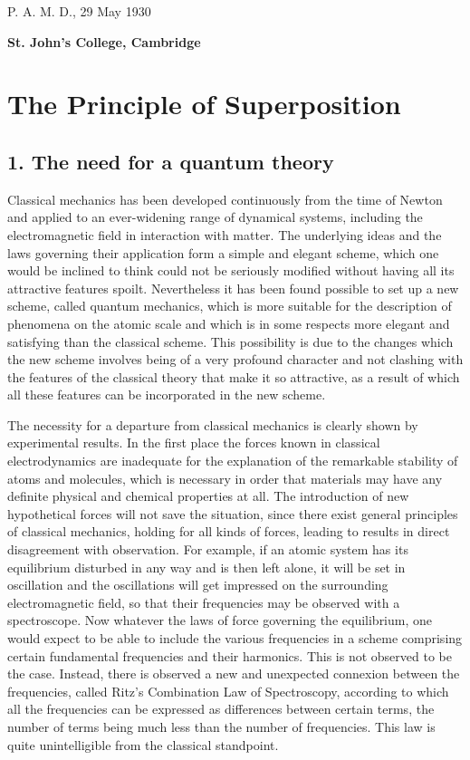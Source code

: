 \noindent P. A. M. D., 29 May 1930 \vspace{3mm}

\noindent\textbf{St. John's College, Cambridge}

\newpage

\section*{The Principle of Superposition}

\subsection{1. The need for a quantum theory}

Classical mechanics has been developed continuously from the time of Newton and applied to an ever-widening range of dynamical systems, including the electromagnetic field in interaction with matter.  The underlying ideas and the laws governing their application form a simple and elegant scheme, which one would be inclined to think could not be seriously modified without having all its attractive features spoilt.  Nevertheless it has been found possible to set up a new scheme, called quantum mechanics, which is more suitable for the description of phenomena on the atomic scale and which is in some respects more elegant and satisfying than the classical scheme.  This possibility is due to the changes which the new scheme involves being of a very profound character and not clashing with the features of the classical theory that make it so attractive, as a result of which all these features can be incorporated in the new scheme.

The necessity for a departure from classical mechanics is clearly shown by experimental results.  In the first place the forces known in classical electrodynamics are inadequate for the explanation of the remarkable stability of atoms and molecules, which is necessary in order that materials may have any definite physical and chemical properties at all.  The introduction of new hypothetical forces will not save the situation, since there exist general principles of classical mechanics, holding for all kinds of forces, leading to results in direct disagreement with observation.  For example, if an atomic system has its equilibrium disturbed in any way and is then left alone, it will be set in oscillation and the oscillations will get impressed on the surrounding electromagnetic field, so that their frequencies may be observed with a spectroscope.  Now whatever the laws of force governing the equilibrium, one would expect to be able to include the various frequencies in a scheme comprising certain fundamental frequencies and their harmonics.  This is not observed to be the case.  Instead, there is observed a new and unexpected connexion between the frequencies, called Ritz's Combination Law of Spectroscopy, according to which all the frequencies can be expressed as differences between certain terms, the number of terms being much less than the number of frequencies.  This law is quite unintelligible from the classical standpoint.

